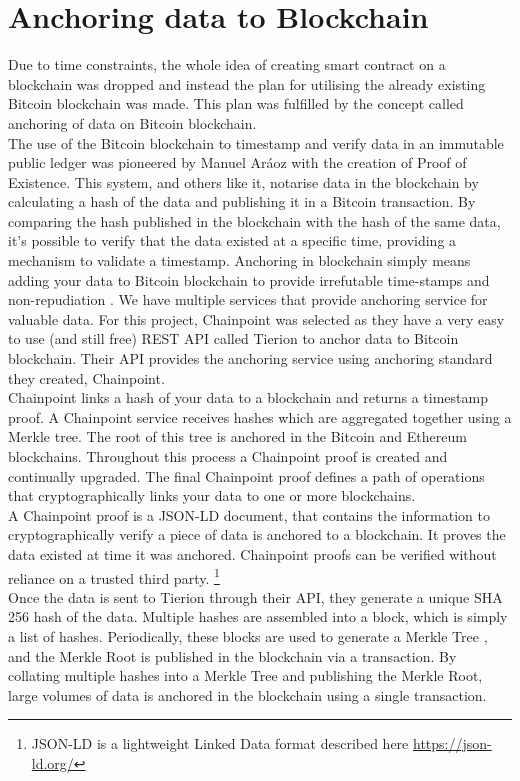 \section{Anchoring data to Blockchain}
Due to time constraints, the whole idea of creating smart contract on a blockchain was dropped and instead the plan for utilising the already existing Bitcoin blockchain was made. This plan was fulfilled by the concept called anchoring of data on Bitcoin blockchain.
\\The use of the Bitcoin blockchain to timestamp and verify data in an immutable public ledger was pioneered by Manuel Aráoz with the creation of Proof of Existence\cite{Araoz2013ProofExistence}. This system, and others like it, notarise data in the blockchain by calculating a hash of the data and publishing it in a Bitcoin transaction. By comparing the hash published in the blockchain with the hash of the same data, it’s possible to verify that the data existed at a specific time, providing a mechanism to validate a timestamp.
Anchoring in blockchain simply means adding your data to Bitcoin blockchain to provide irrefutable time-stamps and non-repudiation \cite{Lemieux2017Blockchain:}. We have multiple services that provide anchoring service for valuable data. For this project, Chainpoint was selected as they have a very easy to use (and still free) REST API called Tierion to anchor data to Bitcoin blockchain. Their API provides the anchoring service using anchoring standard they created, Chainpoint.
\\Chainpoint links a hash of your data to a blockchain and returns a timestamp proof. A Chainpoint service receives hashes which are aggregated together using a Merkle tree. The root of this tree is anchored in the Bitcoin and Ethereum blockchains. Throughout this process a Chainpoint proof is created and continually upgraded. The final Chainpoint proof defines a path of operations that cryptographically links your data to one or more blockchains.\cite{ChainpointStandard}
\\A Chainpoint proof is a JSON-LD document, that contains the information to cryptographically verify a piece of data is anchored to a blockchain. It proves the data existed at time it was anchored. Chainpoint proofs can be verified without reliance on a trusted third party.
\footnote{JSON-LD is a lightweight Linked Data format described here \url{https://json-ld.org/}}
\\Once the data is sent to Tierion through their API, they generate a unique SHA 256 hash of the data. Multiple hashes are assembled into a block, which is simply a list of hashes. Periodically, these blocks are used to generate a Merkle Tree\cite{MerklePROTOCOLSCRYPTOSYSTEMS} , and the Merkle Root is published in the blockchain via a transaction. By collating multiple hashes into a Merkle Tree and publishing the Merkle Root, large volumes of data is anchored in the blockchain using a single transaction. \cite{Wayne2016Chainpoint:Receipts}

